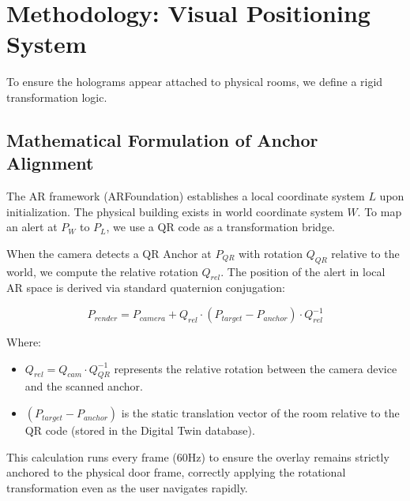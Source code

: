 \documentclass[conference]{IEEEtran}
\begin{document}
\section{Methodology: Visual Positioning System}

To ensure the holograms appear attached to physical rooms, we define a rigid transformation logic.

\subsection{Mathematical Formulation of Anchor Alignment}
The AR framework (ARFoundation) establishes a local coordinate system $L$ upon initialization. The physical building exists in world coordinate system $W$. To map an alert at $P_W$ to $P_L$, we use a QR code as a transformation bridge.

When the camera detects a QR Anchor at $P_{QR}$ with rotation $Q_{QR}$ relative to the world, we compute the relative rotation $Q_{rel}$. The position of the alert in local AR space is derived via standard quaternion conjugation:

\begin{equation}
P_{render} = P_{camera} + Q_{rel} \cdot (P_{target} - P_{anchor}) \cdot Q_{rel}^{-1}
\end{equation}

Where:
\begin{itemize}
    \item $Q_{rel} = Q_{cam} \cdot Q_{QR}^{-1}$ represents the relative rotation between the camera device and the scanned anchor.
    \item $(P_{target} - P_{anchor})$ is the static translation vector of the room relative to the QR code (stored in the Digital Twin database).
\end{itemize}

This calculation runs every frame (60Hz) to ensure the overlay remains strictly anchored to the physical door frame, correctly applying the rotational transformation even as the user navigates rapidly.
\end{document}
